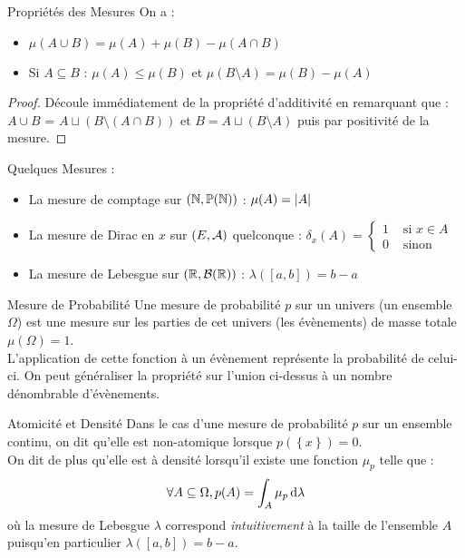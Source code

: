 \documentclass{cours}
\begin{document}
\begin{propositionfr}{Propriétés des Mesures}{}
    On a :
    \begin{itemize}
        \item $\mu(A \cup B) = \mu(A) + \mu(B) - \mu(A \cap B)$
        \item Si $A \subseteq B$ : $\mu(A) \leq \mu(B)$ et $\mu(B \setminus A) = \mu(B) - \mu(A)$
    \end{itemize}
\end{propositionfr}

\begin{proof}
    Découle immédiatement de la propriété d'additivité en remarquant que : $A \cup B$ = $A \sqcup \left(B \setminus \left(A \cap B\right)\right)$ et $B = A \sqcup \left(B \setminus A\right)$ puis par positivité de la mesure.
\end{proof}

Quelques Mesures :
\begin{itemize}
    \item La mesure de comptage sur $\left(\mathbb{N}, \mathbb{P}(\mathbb{N})\right)$ : $\mu(A) = \left|A\right|$
    \item La mesure de Dirac en $x$ sur $\left(E, \mathcal{A}\right)$ quelconque : $\delta_{x}(A) = \begin{cases} 1 &\text{ si } x\in A\\ 0  &\text{ sinon} \end{cases}$
    \item La mesure de Lebesgue sur $\left(\mathbb{R}, \mathcal{B}(\mathbb{R})\right)$ : $\lambda\left(\left[a, b\right]\right) = b - a$
\end{itemize}

\begin{définition}{Mesure de Probabilité}
Une mesure de probabilité $p$ sur un univers (un ensemble $\Omega$) est une mesure sur les parties de cet univers (les évènements) de masse totale $\mu(\Omega) = 1$.\\
L'application de cette fonction à un évènement représente la probabilité de celui-ci. On peut généraliser la propriété sur l'union ci-dessus à un nombre dénombrable d'évènements.
\end{définition}

\begin{définition}{Atomicité et Densité}{}
Dans le cas d'une mesure de probabilité $p$ sur un ensemble continu, on dit qu'elle est non-atomique lorsque $p(\left\{x\right\}) = 0$.\\
On dit de plus qu'elle est à densité lorsqu'il existe une fonction $\mu_{p}$ telle que :
\[
    \forall A \subseteq \Omega, p(A) = \int_{A} \mu_{p} {\rm \, d}\lambda
\]
où la mesure de Lebesgue $\lambda$ correspond \textit{intuitivement} à la taille de l'ensemble $A$ puisqu'en particulier $\lambda(\left[a, b\right]) = b - a$.
\end{définition}
\end{document}
